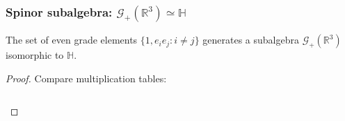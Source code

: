 \documentclass{beamer}
\newcommand{\R}{\mathbb{R}}
\newcommand{\HM}{\mathbb{H}}
\newcommand{\G}{\mathcal{G}}
\begin{document}
\begin{frame}
\frametitle{Spinor subalgebra: $\G_+(\R^3) \simeq \HM$}
\begin{theorem}
    The set of even grade elements $\{1, e_ie_j: i\neq j\}$ generates a subalgebra $\G_+(\R^3)$ isomorphic to $\HM$.
\end{theorem}
\begin{proof}
    Compare multiplication tables:
    \begin{columns}
        \begin{center}
            \renewcommand\arraystretch{1.3}
            \setlength\doublerulesep{0pt}
        \end{center}
    
        \begin{center}
            \renewcommand\arraystretch{1.3}
            \setlength\doublerulesep{0pt}
        \end{center}
    \end{columns}
\end{proof}
\end{frame}
\end{document}
